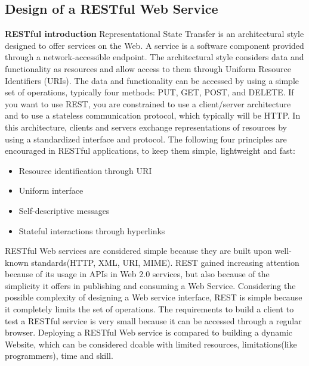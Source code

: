 \subsection{Design of a RESTful Web Service}
\label{subsec:restDes}

\textbf{RESTful introduction}\newline
Representational State Transfer is an architectural style designed to offer services on the Web. A service is a software component provided through a network-accessible endpoint. The architectural style considers data and functionality as resources and allow access to them through Uniform Resource Identifiers (URIs). The data and functionality can be accessed by using a simple set of operations, typically four methods: PUT, GET, POST, and DELETE. If you want to use REST, you are constrained to use a client/server architecture and to use a stateless communication protocol, which typically will be HTTP. In this architecture, clients and servers exchange representations of resources by using a standardized interface and protocol. The following four principles are encouraged in RESTful applications, to keep them simple, lightweight and fast\cite{WhatIsRESTful}\cite{DecidingOnRESTful}:
\begin{itemize}
\item Resource identification through URI
\item Uniform interface
\item Self-descriptive messages
\item Stateful interactions through hyperlinks
\end{itemize}

RESTful Web services are considered simple because they are built upon well-known standards(HTTP, XML, URI, MIME). REST gained increasing attention because of its usage in APIs in Web 2.0 services, but also because of the simplicity it offers in publishing and consuming a Web Service. Considering the possible complexity of designing a Web service interface, REST is simple because it completely limits the set of operations. The requirements to build a client to test a RESTful service is very small because it can be accessed through a regular browser. Deploying a RESTful Web service is compared to building a dynamic Website, which can be considered doable with limited resources, limitations(like programmers), time and skill. \cite{DecidingOnRESTful}


